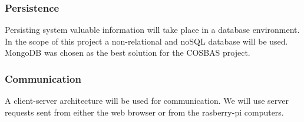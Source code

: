 \subsubsection{Persistence}
Persisting system valuable information will take place in a database environment. In the scope of this project a non-relational and noSQL database will be used. MongoDB was chosen as the best solution for the COSBAS project.

\subsubsection{Communication}
A client-server architecture will be used for communication. We will use server requests sent from either the web browser or from the rasberry-pi computers.
